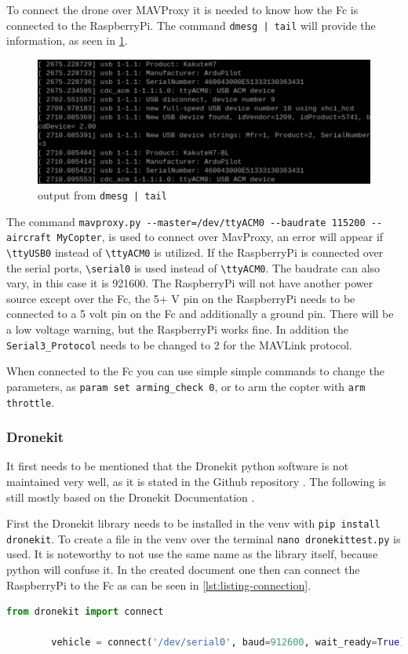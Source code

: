 \documentclass[svgnames]{article}
\begin{document}
	
	To connect the drone over MAVProxy it is needed to know how the \gls{Fc} is connected to the RaspberryPi. The command \lstinline!dmesg | tail! will provide the information, as seen in \cref{fig:usbrasppiconnect}.

\begin{figure}[th]
	\centering
	\includegraphics[width=0.7\linewidth]{pictures/USBRaspPiconnect}
	\caption{output from \lstinline!dmesg | tail!}
	\label{fig:usbrasppiconnect}
\end{figure}
	
	The command \lstinline|mavproxy.py --master=/dev/ttyACM0 --baudrate 115200 --aircraft MyCopter|, is used to connect over MavProxy, an error will appear if \lstinline|\ttyUSB0| instead of \lstinline|\ttyACM0| is utilized. If the RaspberryPi is connected over the serial ports, \lstinline|\serial0| is used instead of \lstinline|\ttyACM0|. The baudrate can also vary, in this case it is 921600. The RaspberryPi will not have another power source except over the \gls{Fc}, the 5+ V pin on the RaspberryPi needs to be connected to a 5 volt pin on the \gls{Fc} and additionally a ground pin. There will be a low voltage warning, but the RaspberryPi works fine. In addition the \lstinline|Serial3_Protocol| needs to be changed to 2 for the MAVLink protocol.
	
	When connected to the \gls{Fc} you can use simple simple commands to change the parameters, as \lstinline|param set arming_check 0|, or to arm the copter with \lstinline|arm throttle|.
	
	\subsubsection{Dronekit}
	It first needs to be mentioned that the Dronekit python software is not maintained very well, as it is stated in the Github repository \cite{dronekitgithub}. The following is still mostly based on the Dronekit Documentation \cite{dronekitdocs}.
	
	First the Dronekit library needs to be installed in the \gls{venv} with \lstinline|pip install dronekit|. To create a file in the \gls{venv} over the terminal \lstinline|nano dronekittest.py| is used. It is noteworthy to not use the same name as the library itself, because python will confuse it. In the created document one then can connect the RaspberryPi to the \gls{Fc} as can be seen in \cref{lst:listing-connection}.
	\begin{lstlisting}[language=Python, style=myPython, caption=Python DroneKit Example, label={lst:listing-connection}]
		from dronekit import connect

		vehicle = connect('/dev/serial0', baud=912600, wait_ready=True)
	\end{lstlisting}
	
\end{document}
